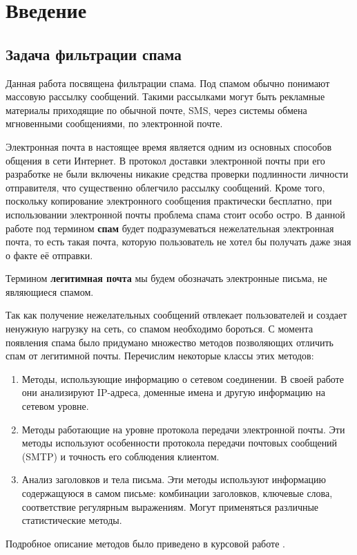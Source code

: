 \newpage
\section{Введение}



\subsection{Задача фильтрации спама}
Данная работа посвящена фильтрации спама. Под спамом обычно понимают массовую рассылку сообщений. Такими рассылками могут быть рекламные материалы приходящие по обычной почте, SMS,  через системы обмена мгновенными сообщениями, по электронной почте.

Электронная почта в настоящее время является одним из основных способов общения в сети Интернет. В протокол доставки электронной почты \cite{RFC2081} \cite{RFC2822} при его разработке не были включены никакие средства проверки подлинности личности отправителя, что существенно облегчило рассылку  сообщений. Кроме того, поскольку копирование электронного сообщения практически бесплатно, при использовании электронной почты проблема спама стоит особо остро. В данной работе под термином \textbf{спам} будет подразумеваться нежелательная электронная почта, то есть такая почта, которую пользователь не хотел бы получать даже зная о факте её отправки.

Термином \textbf{легитимная почта} мы будем обозначать электронные письма, не являющиеся спамом.

Так как получение нежелательных сообщений  отвлекает пользователей и создает ненужную нагрузку на сеть, со спамом необходимо бороться. С момента появления спама было придумано множество методов позволяющих отличить спам от легитимной почты. Перечислим некоторые классы этих методов:
\begin{enumerate}
\item Методы, использующие информацию о сетевом соединении. В своей работе они анализируют IP-адреса, доменные имена и другую информацию на сетевом уровне.
\item Методы работающие на уровне протокола передачи электронной почты. Эти методы используют особенности протокола передачи почтовых сообщений (SMTP)  и точность его соблюдения клиентом.
\item Анализ заголовков и тела письма. Эти методы используют информацию содержащуюся в самом письме: комбинации заголовков, ключевые слова, соответствие регулярным выражениям. Могут применяться различные статистические методы.
\end{enumerate}
Подробное описание методов было приведено в курсовой работе \cite{PETROV10}. 

